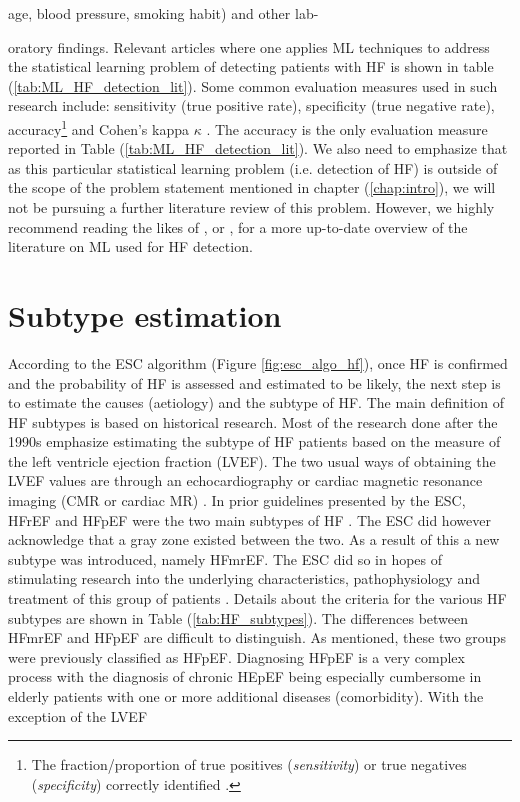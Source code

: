 \documentclass[../thesis.tex]{subfiles}
\begin{document}
age, blood pressure, smoking habit) and other lab-



\noindent oratory findings. Relevant articles where one applies ML techniques to address the statistical learning problem of detecting patients with HF is shown in table (\ref{tab:ML_HF_detection_lit}). Some common evaluation measures used in such research include: sensitivity (true positive rate), specificity (true negative rate), accuracy\footnote{The fraction/proportion of true positives (\textit{sensitivity}) or true negatives (\textit{specificity}) correctly identified \citep{james2013introduction}.} and Cohen's kappa $\kappa$ \citep{cohen1960coefficient}. The accuracy is the only evaluation measure reported in Table (\ref{tab:ML_HF_detection_lit}). We also need to emphasize that as this particular statistical learning problem (i.e. detection of HF) is outside of the scope of the problem statement mentioned in chapter (\ref{chap:intro}), we will not be pursuing a further literature review of this problem. However, we highly recommend reading the likes of \cite{tripoliti2017heart}, \cite{acharya2017application} or \cite{awan2018machine}, for a more up-to-date overview of the literature on ML used for HF detection. 


\section{Subtype estimation}
\label{sec:subtypeest}

\noindent According to the ESC algorithm (Figure \ref{fig:esc_algo_hf}), once HF is confirmed and the probability of HF is assessed and estimated to be likely, the next step is to estimate the causes (aetiology) and the subtype of HF. The main definition of HF subtypes is based on historical research. Most of the research done after the 1990s emphasize estimating the subtype of HF patients based on the measure of the left ventricle ejection fraction (LVEF). The two usual ways of obtaining the LVEF values are through an echocardiography or cardiac magnetic resonance imaging (CMR or cardiac MR) \citep{ponikowski2016}. In prior guidelines presented by the ESC, HFrEF and HFpEF were the two main subtypes of HF \citep{authors2012esc}. The ESC did however acknowledge that a gray zone existed between the two. As a result of this a new subtype was introduced, namely HFmrEF. The ESC did so in hopes of stimulating research into the underlying characteristics, pathophysiology and treatment of this group of patients \citep{ponikowski2016}. Details about the criteria for the various HF subtypes are shown in Table (\ref{tab:HF_subtypes}). The differences between HFmrEF and HFpEF are difficult to distinguish. As mentioned, these two groups were previously classified as HFpEF. Diagnosing HFpEF is a very complex process with the diagnosis of chronic HEpEF being especially cumbersome in elderly patients with one or more additional diseases (comorbidity). With the exception of the LVEF 
\end{document}
